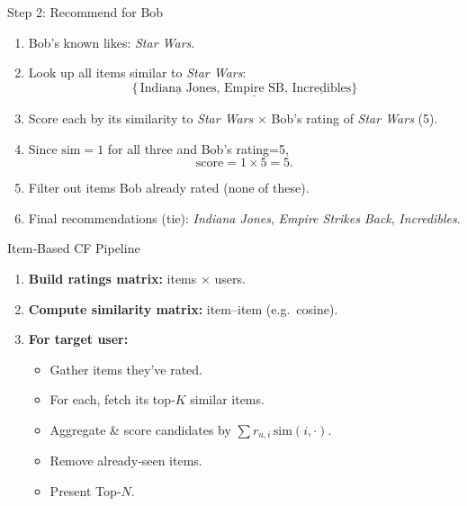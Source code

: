 \documentclass{beamer}
\begin{document}
\begin{frame}{Step 2: Recommend for Bob}
\begin{enumerate}
  \item Bob’s known likes: \textit{Star Wars}.
  \item Look up all items similar to \textit{Star Wars}:
    \[
      \{\,\underline{\text{Indiana Jones}},\,
              \underline{\text{Empire SB}},\,
              \underline{\text{Incredibles}}\}
    \]
  \item Score each by its similarity to \textit{Star Wars} \(\times\) Bob’s rating of \textit{Star Wars} (5).
  \item Since \(\mathrm{sim}=1\) for all three and Bob’s rating=5,
    \[
      \text{score} = 1\times5 = 5.
    \]
  \item Filter out items Bob already rated (none of these).
  \item Final recommendations (tie): \textit{Indiana Jones}, \textit{Empire Strikes Back}, \textit{Incredibles}.
\end{enumerate}
\end{frame}

\begin{frame}{Item‐Based CF Pipeline}
\begin{enumerate}
  \item \textbf{Build ratings matrix:} items \(\times\) users.
  \item \textbf{Compute similarity matrix:} item–item (e.g.\ cosine).
  \item \textbf{For target user:}
    \begin{itemize}
      \item Gather items they’ve rated.
      \item For each, fetch its top‐\(K\) similar items.
      \item Aggregate \& score candidates by \(\sum r_{u,i}\,\mathrm{sim}(i,\cdot)\).
      \item Remove already‐seen items.
      \item Present Top‐\(N\).
    \end{itemize}
\end{enumerate}
\end{frame}

\end{document}
